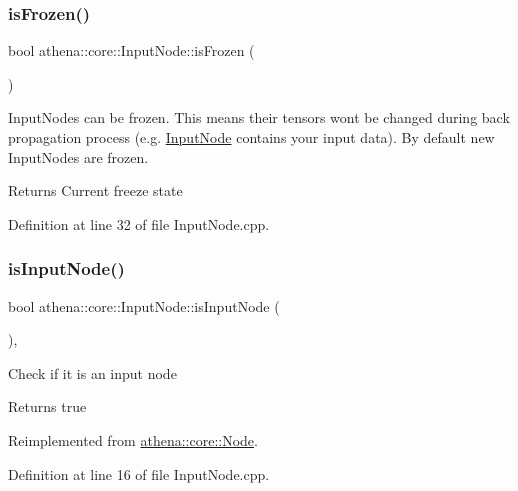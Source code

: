 \subsubsection{\texorpdfstring{is\+Frozen()}{isFrozen()}}
{\footnotesize\ttfamily bool athena\+::core\+::\+Input\+Node\+::is\+Frozen (\begin{DoxyParamCaption}{ }\end{DoxyParamCaption})}

Input\+Nodes can be frozen. This means their tensors won\textquotesingle{}t be changed during back propagation process (e.\+g. \mbox{\hyperlink{classathena_1_1core_1_1_input_node}{Input\+Node}} contains your input data). By default new Input\+Nodes are frozen. \begin{DoxyReturn}{Returns}
Current freeze state 
\end{DoxyReturn}


Definition at line 32 of file Input\+Node.\+cpp.

\mbox{\label{classathena_1_1core_1_1_input_node_a2548b569a336b75c0005295833052979}} 
\subsubsection{\texorpdfstring{is\+Input\+Node()}{isInputNode()}}
{\footnotesize\ttfamily bool athena\+::core\+::\+Input\+Node\+::is\+Input\+Node (\begin{DoxyParamCaption}{ }\end{DoxyParamCaption})\hspace{0.3cm}{\ttfamily [override]}, {\ttfamily [virtual]}}

Check if it is an input node \begin{DoxyReturn}{Returns}
true 
\end{DoxyReturn}


Reimplemented from \mbox{\hyperlink{classathena_1_1core_1_1_node_a6ae012557fc6b29127366b1e92801d4a}{athena\+::core\+::\+Node}}.



Definition at line 16 of file Input\+Node.\+cpp.

\mbox{\label{classathena_1_1core_1_1_input_node_a45311e1bbff5dd28df3c3877aaa10109}} 
